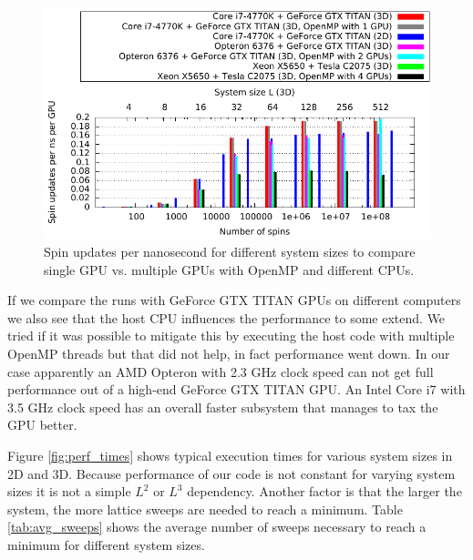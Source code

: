\documentclass[paper=a4, fontsize=11pt]{scrartcl} %
\numberwithin{equation}{section} %
\numberwithin{figure}{section} %
\numberwithin{table}{section} %
\begin{document}
\begin{figure}
\centering
\includegraphics[width=\textwidth]{images/perf_flips.pdf}
\caption{Spin updates per nanosecond for different system sizes to compare single GPU vs. multiple GPUs with OpenMP and different CPUs.}
\label{fig:perf_flips}
\end{figure}

If we compare the runs with GeForce GTX TITAN GPUs on different computers we also see that the host CPU influences the performance to some extend. We tried if it was possible to mitigate this by executing the host code with multiple OpenMP threads but that did not help, in fact performance went down. In our case apparently an AMD Opteron with 2.3 GHz clock speed can not get full performance out of a high-end GeForce GTX TITAN GPU. An Intel Core i7 with 3.5 GHz clock speed has an overall faster subsystem that manages to tax the GPU better.

Figure \ref{fig:perf_times} shows typical execution times for various system sizes in 2D and 3D. Because performance of our code is not constant for varying system sizes it is not a simple $L^2$ or $L^3$ dependency. Another factor is that the larger the system, the more lattice sweeps are needed to reach a minimum. Table \ref{tab:avg_sweeps} shows the average number of sweeps necessary to reach a minimum for different system sizes.
\end{document}
